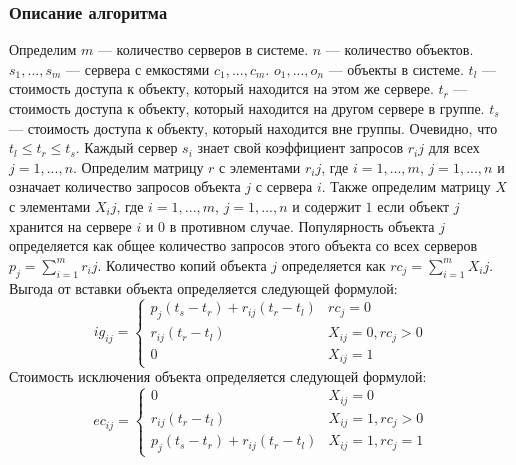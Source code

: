		\subsubsection{Описание алгоритма}
			Определим $m$ --- количество серверов в системе. $n$ --- количество объектов. $s_1, ..., s_m$ --- сервера с емкостями
			$c_1, ..., c_m$. $o_1, ..., o_n$ --- объекты в системе. $t_l$ --- стоимость доступа к объекту, который находится на 
			этом же сервере. $t_r$ --- стоимость доступа к объекту, который находится на другом сервере в группе. $t_s$ --- стоимость 
			доступа к объекту, который находится вне группы. Очевидно, что $t_l \leq t_r \leq t_s$. Каждый сервер $s_i$ знает свой
			коэффициент запросов $r_ij$ для всех $j = 1, ..., n$. Определим матрицу $r$ с элементами $r_ij$, где $i = 1, ..., m$,
			$j = 1, ..., n$ и означает количество запросов объекта $j$ с сервера $i$. Также определим матрицу $X$ с элементами 
			$X_ij$, где $i = 1, ..., m$, $j = 1, ..., n$ и содержит $1$ если объект $j$ хранится на сервере $i$ и $0$  в противном случае.
			Популярность объекта $j$ определяется как общее количество запросов этого объекта со всех серверов $p_j = \sum_{i=1}^{m} r_ij$.
			Количество копий объекта $j$ определяется как $rc_j = \sum_{i=1}^{m} X_ij$.
			Выгода от вставки объекта определяется следующей формулой: 
			 \[ 	
				ig_{ij} =
				\begin{cases} 
			 		p_j (t_s - t_r) + r_{ij} (t_r - t_l) 	& rc_j = 0 \\
			 		r_{ij} (t_r - t_l) 						& X_{ij} = 0, rc_j > 0 \\
			 		0 										    & X_{ij} = 1 
			  	\end{cases}
			 \]
			Стоимость исключения объекта определяется следующей формулой:
			\[ 	
				ec_{ij} =
				\begin{cases} 
					0										& X_{ij} = 0 \\
					r_{ij} (t_r - t_l) 						& X_{ij} = 1, rc_j > 0 \\
					p_j (t_s - t_r) + r_{ij} (t_r - t_l)	& X_{ij} = 1, rc_j = 1 
			 	\end{cases}
			\]


